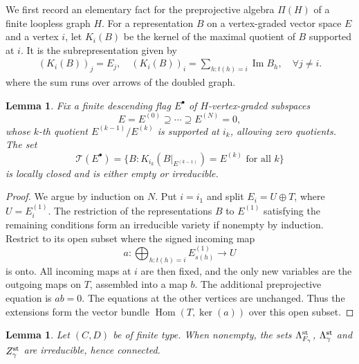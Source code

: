 \documentclass[11pt,reqno]{amsart}
\newtheorem{Lemma}[Theorem]{Lemma}
\theoremstyle{definition}
\theoremstyle{remark}
\def\Hom{\operatorname{Hom}}
\begin{document}
We first record an elementary fact for the preprojective
algebra $\Pi(H)$ of a finite loopless graph $H$. For a representation $B$
on a vertex-graded vector space $E$ and a vertex $i$, let $K_i(B)$
be the kernel of the maximal quotient of $B$ supported at $i$.
It is the subrepresentation given by
\begin{align}\label{K1}
(K_i(B))_j=E_j
,\quad
(K_i(B))_i=\sum_{h:t(h)=i}\operatorname{Im}B_h
,\quad \forall j\neq i.
\end{align}
where the sum runs over arrows of the doubled graph.

\begin{Lemma}\label{lem:prepro}
Fix a finite descending flag $E^\bullet$ of $H$-vertex-graded subspaces
\[
 E=E^{(0)}\supseteq\cdots\supseteq E^{(N)}=0,
\]
whose $k$-th quotient $E^{(k-1)}/E^{(k)}$ is supported at $i_k$, allowing zero quotients. 
The set
\[
 \mathcal T(E^\bullet)=
 \{B:K_{i_k}(B|_{E^{(k-1)}})=E^{(k)}\text{ for all }k\}
\]
is  locally closed and is either empty or irreducible. 
\end{Lemma}

\begin{proof}
We argue by induction on $N$.
Put $i=i_1$ and split $E_i=U\oplus T$, where $U=E_i^{(1)}$.
The restriction of the representations $B$ to $E^{(1)}$ satisfying the remaining
conditions form an irreducible variety if nonempty by induction. Restrict to its
open subset where the signed incoming map
\[
 a:\bigoplus_{h:t(h)=i}E_{s(h)}^{(1)}\longrightarrow U
\]
is onto. All incoming maps at $i$ are then fixed, and the only new
variables are the outgoing maps on $T$, assembled into a map $b$.
The additional preprojective equation is $a b=0$.
The equations at the other vertices are unchanged. Thus the extensions
form the vector bundle $\Hom(T,\ker(a))$ over this open
subset. 
\end{proof}

\begin{Lemma}\label{lem:stable-irreducible}
Let $(C,D)$ be of finite type. When nonempty, the sets 
$\Lambda_{F_\gamma}^{\rm st}$, $\Lambda_\gamma^{\rm st}$ and
$Z_\gamma^{\rm st}$ are irreducible, hence connected.
\end{Lemma}
\end{document}
